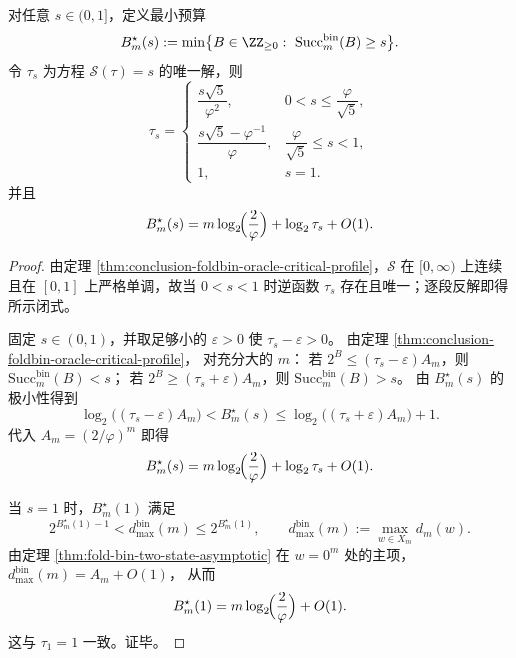 \begin{corollary}[给定成功率的最小比特预算具有精确一阶反演]\label{cor:conclusion-foldbin-oracle-budget-inversion}
对任意 \(s\in(0,1]\)，定义最小预算
\[
B_m^\star(s):=\min\bigl\{B\in\ZZ_{\ge 0}:\ \mathrm{Succ}_m^{\mathrm{bin}}(B)\ge s\bigr\}.
\]
令 \(\tau_s\) 为方程 \(\mathscr S(\tau)=s\) 的唯一解，则
\[
\tau_s=
\begin{cases}
\dfrac{s\sqrt5}{\varphi^2}, & 0<s\le \dfrac{\varphi}{\sqrt5},\\[8pt]
\dfrac{s\sqrt5-\varphi^{-1}}{\varphi}, & \dfrac{\varphi}{\sqrt5}\le s<1,\\[10pt]
1, & s=1.
\end{cases}
\]
并且
\[
B_m^\star(s)
=
m\log_2\!\Bigl(\frac{2}{\varphi}\Bigr)+\log_2\tau_s+O(1).
\]
\end{corollary}
\begin{proof}
由定理 \ref{thm:conclusion-foldbin-oracle-critical-profile}，\(\mathscr S\) 在 \([0,\infty)\) 上连续且在 \([0,1]\) 上严格单调，故当 \(0<s<1\) 时逆函数 \(\tau_s\) 存在且唯一；逐段反解即得所示闭式。

固定 \(s\in(0,1)\)，并取足够小的 \(\varepsilon>0\) 使 \(\tau_s-\varepsilon>0\)。
由定理 \ref{thm:conclusion-foldbin-oracle-critical-profile}，
对充分大的 \(m\)：
若 \(2^B\le (\tau_s-\varepsilon)A_m\)，则
\(\mathrm{Succ}_m^{\mathrm{bin}}(B)<s\)；
若 \(2^B\ge (\tau_s+\varepsilon)A_m\)，则
\(\mathrm{Succ}_m^{\mathrm{bin}}(B)>s\)。
由 \(B_m^\star(s)\) 的极小性得到
\[
\log_2\!\bigl((\tau_s-\varepsilon)A_m\bigr)
<
B_m^\star(s)
\le
\log_2\!\bigl((\tau_s+\varepsilon)A_m\bigr)+1.
\]
代入 \(A_m=(2/\varphi)^m\) 即得
\[
B_m^\star(s)
=
m\log_2\!\Bigl(\frac{2}{\varphi}\Bigr)+\log_2\tau_s+O(1).
\]

当 \(s=1\) 时，\(B_m^\star(1)\) 满足
\[
2^{B_m^\star(1)-1}<d_{\max}^{\mathrm{bin}}(m)\le 2^{B_m^\star(1)},
\qquad
d_{\max}^{\mathrm{bin}}(m):=\max_{w\in X_m}d_m(w).
\]
由定理 \ref{thm:fold-bin-two-state-asymptotic} 在 \(w=0^m\) 处的主项，
\(
d_{\max}^{\mathrm{bin}}(m)=A_m+O(1)
\)，
从而
\[
B_m^\star(1)=m\log_2\!\Bigl(\frac{2}{\varphi}\Bigr)+O(1).
\]
这与 \(\tau_1=1\) 一致。证毕。
\end{proof}

